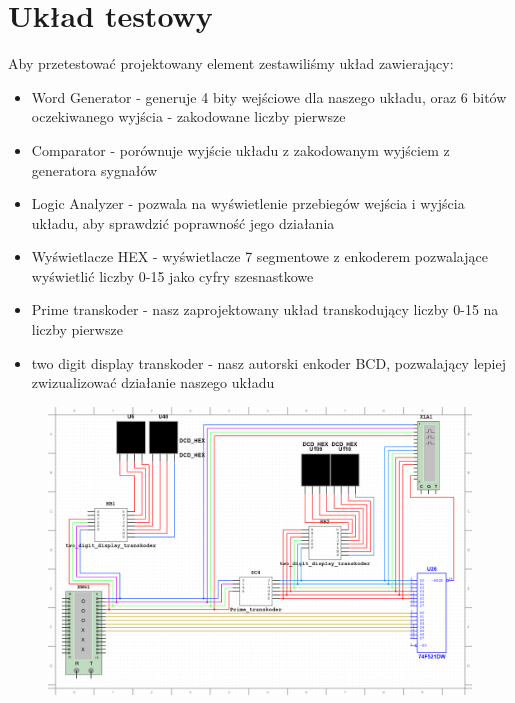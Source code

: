 \documentclass[a4paper]{article}
\begin{document}
\section{Układ testowy}
Aby przetestować projektowany element zestawiliśmy układ zawierający:
\begin{itemize}
  \item Word Generator - generuje 4 bity wejściowe dla naszego układu, oraz 6 bitów oczekiwanego wyjścia - zakodowane liczby pierwsze
  \item Comparator - porównuje wyjście układu z zakodowanym wyjściem z generatora sygnałów
  \item Logic Analyzer - pozwala na wyświetlenie przebiegów wejścia i wyjścia układu, aby sprawdzić poprawność jego działania
  \item Wyświetlacze HEX - wyświetlacze 7 segmentowe z enkoderem pozwalające wyświetlić liczby 0-15 jako cyfry szesnastkowe
  \item Prime transkoder - nasz zaprojektowany układ transkodujący liczby 0-15 na liczby pierwsze
  \item two digit display transkoder - nasz autorski enkoder BCD, pozwalający lepiej zwizualizować działanie naszego układu
\end{itemize}

\begin{figure}[H]
  \centering
  \includegraphics[width=\linewidth]{schemat.png}
 \end{figure}
\end{document}
